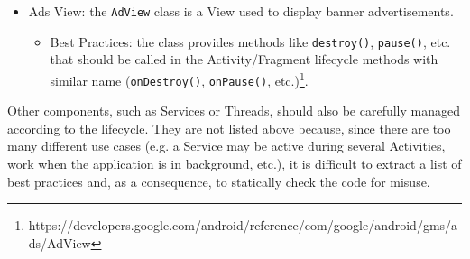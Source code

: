 \documentclass[11pt,a4paper,notitlepage]{article}
\begin{document}
\begin{itemize}
\begin{itemize}
\begin{itemize}
			\end{itemize}
		\end{itemize}
	\item Ads View: the \texttt{AdView} class is a View used to display banner advertisements.
	\begin{itemize}
		\item Best Practices: the class provides methods like \texttt{destroy()}, \texttt{pause()}, etc. that should be called in the Activity/Fragment lifecycle methods with similar name (\texttt{onDestroy()}, \texttt{onPause()}, etc.)\footnote{https://developers.google.com/android/reference/com/google/android/gms/ads/AdView}.
	\end{itemize}
\end{itemize}\medskip
Other components, such as Services or Threads, should also be carefully managed according to the lifecycle. They are not listed above because, since there are too many different use cases (e.g. a Service may be active during several Activities, work when the application is in background, etc.), it is difficult to extract a list of best practices and, as a consequence, to statically check the code for misuse.
\end{document}

